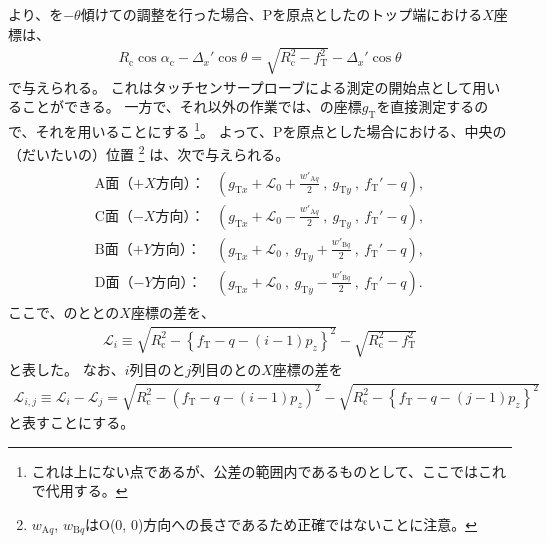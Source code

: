 \clearpage
より、\Table を$-\theta$傾けて\AlocationLength の調整を行った場合、\TableCenter Pを原点とした\CenterCurvatureLine のトップ端における$X$座標は、
\begin{align*}
  R_\mathrm c\cos\alpha_\mathrm c-\Delta_x'\cos\theta = \sqrt{R_\mathrm c^2-f_\mathrm T^2}-\Delta_x'\cos\theta
\end{align*}
で与えられる。
これはタッチセンサープローブによる測定の開始点として用いることができる。
一方で、それ以外の作業では、\TopIDCenter の座標$g_\mathrm T$を直接測定するので、それを用いることにする
\footnote{これは\CenterCurvatureLine 上にない点であるが、公差の範囲内であるものとして、ここではこれで代用する。}。
よって、\TableCenter Pを原点とした場合における、\DimpleFirstRow 中央の（だいたいの）位置
\footnote{$w_{\mathrm Aq}$, $w_{\mathrm Bq}$は\CurvatureCenter{}O(0, 0)方向への長さであるため正確ではないことに注意。}\relax
は、次で与えられる。
\begin{align*}
\begin{array}{rl}
  \text{A面（$+X$方向）：}
  & \displaystyle
    \left(
      g_{\mathrm Tx}+\mathcal L_0+\frac{w'_{\mathrm Aq}}2~,~
      g_{\mathrm Ty}~,~
      f_\mathrm T'-q
    \right),\\[12pt]
  \text{C面（$-X$方向）：}
  & \displaystyle
    \left(
      g_{\mathrm Tx}+\mathcal L_0-\frac{w'_{\mathrm Aq}}2~,~
      g_{\mathrm Ty}~,~
      f_\mathrm T'-q
    \right),\\[12pt]
  \text{B面（$+Y$方向）：}
  & \displaystyle
    \left(
      g_{\mathrm Tx}+\mathcal L_0~,~
      g_{\mathrm Ty}+\frac{w'_{\mathrm Bq}}2~,~
      f_\mathrm T'-q
    \right),\\[12pt]
  \text{D面（$-Y$方向）：}
  & \displaystyle
    \left(
      g_{\mathrm Tx}+\mathcal L_0~,~
      g_{\mathrm Ty}-\frac{w'_{\mathrm Bq}}2~,~
      f_\mathrm T'-q
    \right).
\end{array}
\end{align*}
ここで、\DimpleIRow の\CurvatureCenter と\TopCurvatureCenter との$X$座標の差を、
\begin{align}
  \label{eq:dimpleCenterDistance}
  \mathcal L_i
  \equiv \sqrt{R_\mathrm c^2-\left\{f_\mathrm T-q-(i-1)p_z\right\}^2}-\sqrt{R_\mathrm c^2-f_\mathrm T^2}
\end{align}
と表した。
なお、$i$列目の\CurvatureCenter と$j$列目の\CurvatureCenter との$X$座標の差を
\begin{align*}
  \mathcal L_{i,j}
  \equiv \mathcal L_i-\mathcal L_j
  = \sqrt{R_\mathrm c^2-\left(f_\mathrm T-q-(i-1)p_z\right)^2}
    -\sqrt{R_\mathrm c^2-\left\{f_\mathrm T-q-(j-1)p_z\right\}^2}
\end{align*}
と表すことにする。


